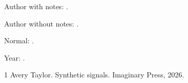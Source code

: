 \documentclass{article}
\begin{document}
Author with notes: \citeauthor[p.~12, note]{Example2026}.

Author without notes: \citeauthor{Example2026}.

Normal: \citep[see][p.~12, note]{Example2026}.

Year: \citeyearpar[see][p.~12, note]{Example2026}.
\begin{thebibliography}{1}
 Avery Taylor. Synthetic signals. Imaginary Press, 2026.
\end{thebibliography}
\end{document}
